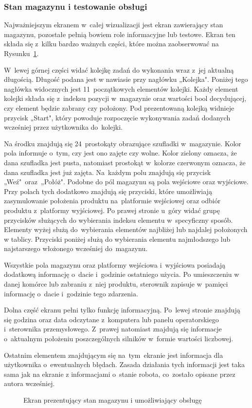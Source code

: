 \subsubsection{Stan magazynu i testowanie obsługi}
Najważniejszym ekranem w~całej wizualizacji jest ekran zawierający stan magazynu, pozostałe pełnią bowiem role informacyjne lub testowe. Ekran ten składa się z~kilku bardzo ważnych części, które można zaobserwować na Rysunku~\ref{vis3}. 

W~lewej górnej części widać kolejkę zadań do wykonania wraz z~jej aktualną długością. Długość podana jest w nawiasie przy nagłówku „Kolejka". Poniżej tego nagłówka widocznych jest 11~początkowych elementów kolejki. Każdy element kolejki składa się z~indeksu pozycji w~magazynie oraz wartości bool decydującej, czy element będzie zabrany czy położony. Pod prezentowaną kolejką widnieje przycisk „\noindent Start", który powoduje rozpoczęcie wykonywania zadań dodanych wcześniej przez użytkownika do~kolejki. 

Na środku znajdują się 24~prostokąty obrazujące szufladki w~magazynie. Kolor pola informuje o~tym, czy jest ono zajęte czy wolne. Kolor zielony oznacza, że dana szufladka jest pusta, natomiast prostokąt w~kolorze czerwonym oznacza, że dana szufladka jest już zajęta. Na~każdym polu znajdują się przycisk „Weź"~oraz~„Połóż". Podobne do pól magazynu są pola wejściowe oraz wyjściowe. Przy polach tych dodatkowo znajdują się przyciski, które umożliwiają zasymulowanie położenia produktu na~platformie wejściowej oraz odbiór produktu z~platformy wyjściowej. Po prawej stronie u~góry widać grupę przycisków służących do wybierania indeksu elementu w~specyficzny sposób. Elementy wyżej służą do~wybierania elementów najbliżej lub najdalej położonych w tablicy. Przyciski poniżej służą do wybierania elementu najmłodszego lub najstarszego włożonego wcześniej do~magazynu. 

Wszystkie pola magazynu oraz platformy wejściowa i~wyjściowa posiadają dodatkową informację o~dacie i~godzinie ostatniego użycia. Po umieszczeniu w danej komórce lub zabraniu z~niej produktu, sterownik zapisuje w~pamięci informację o~dacie i~godzinie tego zdarzenia. 

Dolna część ekranu pełni tylko funkcję informacyjną. Po~lewej stronie znajdują się godzina oraz data odczytane z~komputera lub panelu operatorskiego i~sterownika przemysłowego. Z~prawej natomiast znajdują się informacje o~aktualnym położeniu poszczególnych silników w~formie wartości liczbowej. 

Ostatnim elementem znajdującym się na~tym~ekranie jest informacja dla użytkownika o~ewentualnych błędach. Zasada działania tych informacji jest taka sama jak na ekranie z informacjami o~stanie robota, co~zostało opisane przez autora wcześniej.
\begin{figure}[!htb]
\centering 	
\caption{Ekran prezentujący stan magazynu i umożliwiający obsługę} 
\label{vis3}
\end{figure}
